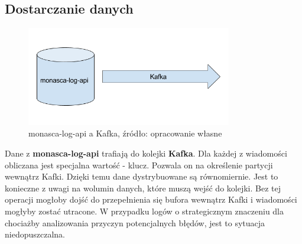     \subsection{Dostarczanie danych}
    \begin{figure}[H]
        \centering
        \includegraphics[width=0.80\textwidth]{images/monasca_log_api_to_kafka}
        \caption[monasca-log-api a Kafka]{
            monasca-log-api a Kafka, źródło: opracowanie własne
        }
        \label{chapter:monasca:monasca_log_api:kafka}
    \end{figure}
    Dane z \textbf{monasca-log-api} trafiają do kolejki \textbf{Kafka}.
    Dla każdej z wiadomości obliczana jest specjalna wartość - klucz. Pozwala on na określenie partycji
    wewnątrz Kafki. Dzięki temu dane dystrybuowane są równomiernie. Jest to konieczne z uwagi
    na wolumin danych, które muszą wejść do kolejki. Bez tej operacji mogłoby dojść do przepełnienia się
    bufora wewnątrz Kafki i wiadomości mogłyby zostać utracone. W przypadku logów o strategicznym
    znaczeniu dla chociażby analizowania przyczyn potencjalnych błędów, jest to sytuacja niedopuszczalna.
    